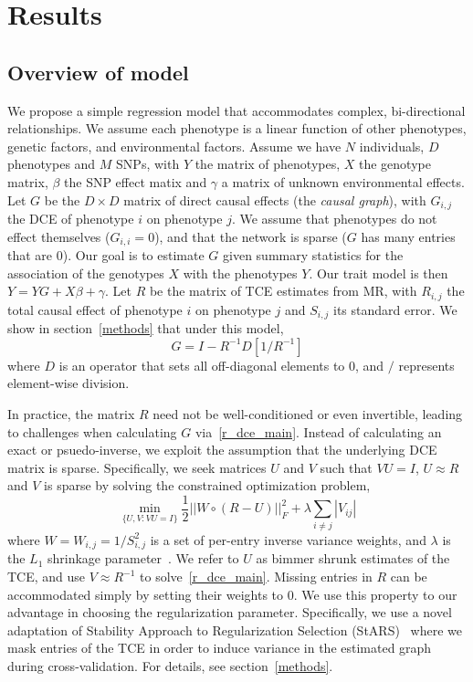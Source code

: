 \documentclass{article}
\begin{document}
\section{Results}
\subsection*{Overview of model}
We propose a simple regression model that accommodates complex, bi-directional relationships.
We assume each phenotype is a linear function
of other phenotypes, genetic factors, and environmental factors.
Assume we have $N$ individuals, $D$ phenotypes and $M$ SNPs,
with $Y$ the matrix of phenotypes, $X$ the genotype
matrix, $\beta$ the SNP effect matix and $\gamma$ a matrix of unknown
environmental effects. Let $G$ be the $D \times D$ matrix of
direct causal effects (the \emph{causal graph}), with $G_{i, j}$ the DCE of phenotype $i$ on
phenotype $j$. We assume that phenotypes do not effect themselves ($G_{i,i} = 0$),
and that the network is sparse ($G$ has many entries that are $0$).
Our goal is to estimate $G$ given summary statistics
 for the association of the genotypes $X$ with the phenotypes $Y$.
 Our trait model is then $Y = Y G + X\beta + \gamma$.
Let $R$ be the matrix of TCE estimates from MR, with $R_{i,j}$ the total
causal effect of phenotype $i$ on phenotype $j$ and $S_{i,j}$ its standard error.
We show in section~\ref{methods} that under this model,
\begin{equation}\label{r_dce_main}
G = I - R^{-1} D[1 / R^{-1}]
\end{equation}
where $D$ is an operator that sets all off-diagonal elements to 0, and $/$
represents element-wise division.

In practice, the matrix $R$ need not be well-conditioned or
 even invertible, leading
to challenges when calculating $G$ via~\eqref{r_dce_main}. Instead of calculating an exact
or psuedo-inverse, we exploit the assumption that the underlying
DCE matrix is sparse. Specifically, we seek matrices $U$ and $V$ such that $VU=I$, $U \approx R$
and $V$ is sparse by solving the constrained optimization problem,
\begin{equation} \label{opt_main}
\min_{\{U, V : VU = I\}} \frac{1}{2} ||W \circ (R - U)||_F^2 +
   \lambda \sum_{i\neq j}|V_{ij}|
\end{equation}
where $W = W_{i,j} = 1/S_{i,j}^2$ is a set of per-entry inverse variance weights,
and $\lambda$ is the $L_1$ shrinkage parameter~\cite{Friedman2007,Tishbirani1996}.
We refer to $U$ as bimmer shrunk estimates of the TCE, and
use $V \approx R^{-1}$ to solve~\eqref{r_dce_main}.
Missing entries in $R$ can be accommodated simply
by setting their weights to 0. We use this property to our advantage in choosing the
regularization parameter. Specifically, we use a novel adaptation of Stability Approach
to Regularization Selection (StARS)~\cite{Liu2010} where we mask entries of the TCE
in order to induce variance in the estimated graph during cross-validation.
For details, see section~\ref{methods}.
\end{document}
